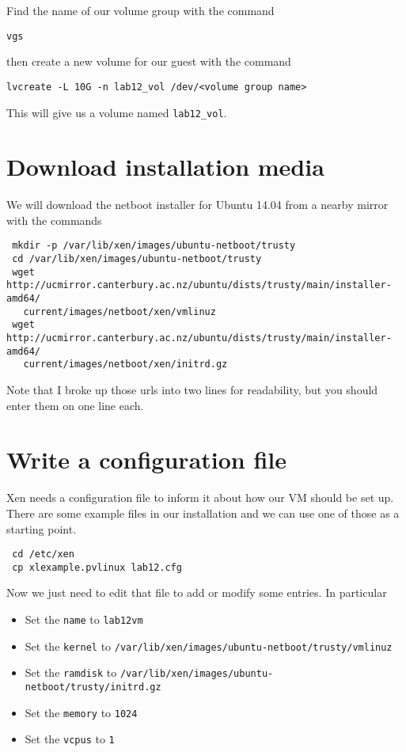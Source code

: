 \documentclass{article}
\begin{document}
 Find the name of our volume group with the command
 
 \texttt{vgs}
 
 then create a new volume for our guest with the command 
 
 \texttt{lvcreate -L 10G -n lab12\_vol /dev/<volume group name>}
 
 This will give us a volume named \texttt{lab12\_vol}.

 \section{Download installation media}
 We will download the netboot installer for Ubuntu 14.04 from a nearby mirror with the commands
 
 \begin{verbatim}
 mkdir -p /var/lib/xen/images/ubuntu-netboot/trusty
 cd /var/lib/xen/images/ubuntu-netboot/trusty
 wget http://ucmirror.canterbury.ac.nz/ubuntu/dists/trusty/main/installer-amd64/
   current/images/netboot/xen/vmlinuz
 wget http://ucmirror.canterbury.ac.nz/ubuntu/dists/trusty/main/installer-amd64/
   current/images/netboot/xen/initrd.gz
 \end{verbatim}
 
 Note that I broke up those urls into two lines for readability, but you should enter them on one line each.
 
 \section{Write a configuration file}
 Xen needs a configuration file to inform it about how our VM should be set up. There are some example files in our installation
 and we can use one of those as a starting point.
 
 \begin{verbatim}
 cd /etc/xen
 cp xlexample.pvlinux lab12.cfg
 \end{verbatim}
 
 Now we just need to edit that file to add or modify some entries. In particular
 
 \begin{itemize}
  \item Set the \texttt{name} to \texttt{lab12vm}
  \item Set the \texttt{kernel} to \texttt{/var/lib/xen/images/ubuntu-netboot/trusty/vmlinuz}
  \item Set the \texttt{ramdisk} to \texttt{/var/lib/xen/images/ubuntu-netboot/trusty/initrd.gz}
  \item Set the \texttt{memory} to \texttt{1024}
   \item Set the \texttt{vcpus} to \texttt{1}
 \end{itemize}
 
\end{document}
